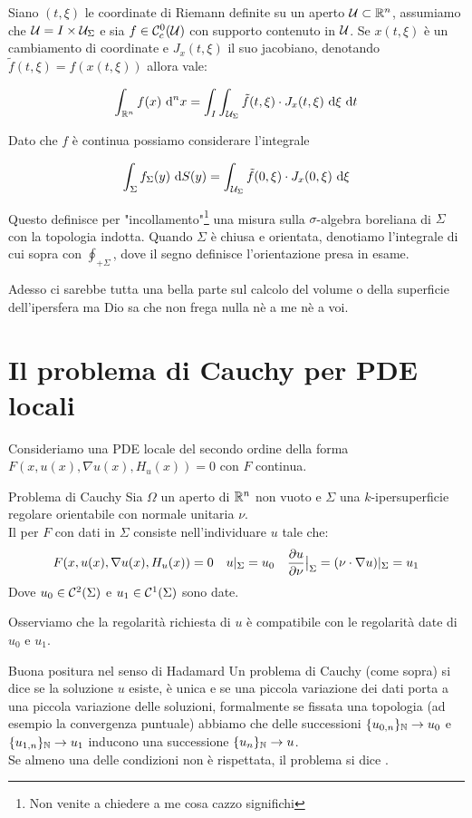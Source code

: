 \documentclass{article}
\begin{document}
Siano $(t,\xi)$ le coordinate di Riemann definite su un aperto $\mathcal{U} \subset \mathbb{R}^n$, assumiamo che $\mathcal{U}=I\times\mathcal{U}_\Sigma$ e sia $f \in \mathcal{C}_c^0(\mathcal{U})$ con supporto contenuto in $\mathcal{U}$. Se $x(t,\xi)$ è un cambiamento di coordinate e $J_x(t,\xi)$ il suo jacobiano, denotando $\tilde{f}(t,\xi) = f(x(t,\xi))$ allora vale:

\[\int_{\mathbb{R}^n} f(x)\text{ d}^n x = \int_I \int_{\mathcal{U}_\Sigma} \tilde{f}(t,\xi) \cdot J_x(t,\xi) \text{ d}\xi\text{ d} t \]

Dato che $f$ è continua possiamo considerare l'integrale

\[\int_\Sigma f_\Sigma(y) \text{ d} S(y) = \int_{\mathcal{U}_\Sigma}\tilde{f}(0,\xi) \cdot J_x(0,\xi) \text{ d}\xi\]

Questo definisce per "incollamento"\footnote{Non venite a chiedere a me cosa cazzo significhi} una misura sulla $\sigma$-algebra boreliana di $\Sigma$ con la topologia indotta. Quando $\Sigma$ è chiusa e orientata, denotiamo l'integrale di cui sopra con $\oint_{+\Sigma}$, dove il segno definisce l'orientazione presa in esame.

Adesso ci sarebbe tutta una bella parte sul calcolo del volume o della superficie dell'ipersfera ma Dio sa che non frega nulla nè a me nè a voi.

\section{Il problema di Cauchy per PDE locali}

Consideriamo una PDE locale del secondo ordine della forma $F(x,u(x),\nabla u(x), H_u(x)) = 0$ con $F$ continua.

\begin{definition}{Problema di Cauchy}{}
    Sia $\Omega$ un aperto di $\mathbb{R}^n$ non vuoto e $\Sigma$ una $k$-ipersuperficie regolare orientabile con normale unitaria $\nu$.\\
    Il  per $F$ con dati in $\Sigma$ consiste nell'individuare $u$ tale che:
    \[F(x,u(x),\nabla u(x), H_u(x)) = 0 \quad u|_\Sigma = u_0 \quad \frac{\partial u}{\partial \nu}\big{|}_\Sigma = (\nu \cdot \nabla u)|_\Sigma = u_1\]
    Dove $u_0 \in \mathcal{C}^2(\Sigma)$ e $u_1 \in \mathcal{C}^1(\Sigma)$ sono date.
\end{definition}

Osserviamo che la regolarità richiesta di $u$ è compatibile con le regolarità date di $u_0$ e $u_1$.

\begin{definition}{Buona positura nel senso di Hadamard}{}
    Un problema di Cauchy (come sopra) si dice  se la soluzione $u$ esiste, è unica e se una piccola variazione dei dati porta a una piccola variazione delle soluzioni, formalmente se fissata una topologia (ad esempio la convergenza puntuale) abbiamo che delle successioni $\{u_{0,n}\}_{\mathbb{N}}\to u_0$ e $\{u_{1,n}\}_{\mathbb{N}}\to u_1$ inducono una successione $\{u_n\}_{\mathbb{N}}\to u$.\\
    Se almeno una delle condizioni non è rispettata, il problema si dice .
\end{definition}
\end{document}
